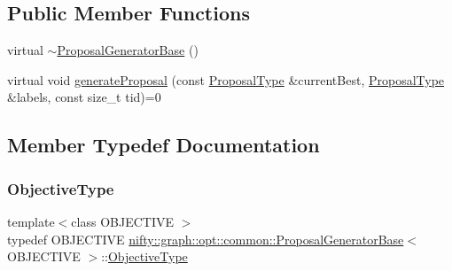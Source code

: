 \subsection*{Public Member Functions}
\begin{DoxyCompactItemize}
\item 
virtual \hyperlink{classnifty_1_1graph_1_1opt_1_1common_1_1ProposalGeneratorBase_ac3cf261170f3fb5beb3ecfc483e3fb48}{$\sim$\+Proposal\+Generator\+Base} ()
\item 
virtual void \hyperlink{classnifty_1_1graph_1_1opt_1_1common_1_1ProposalGeneratorBase_abb7b02d650049f52733b3f2dc81bb395}{generate\+Proposal} (const \hyperlink{classnifty_1_1graph_1_1opt_1_1common_1_1ProposalGeneratorBase_a122993da5c326628cdb865a6279d20c5}{Proposal\+Type} \&current\+Best, \hyperlink{classnifty_1_1graph_1_1opt_1_1common_1_1ProposalGeneratorBase_a122993da5c326628cdb865a6279d20c5}{Proposal\+Type} \&labels, const size\+\_\+t tid)=0
\end{DoxyCompactItemize}


\subsection{Member Typedef Documentation}
\mbox{\label{classnifty_1_1graph_1_1opt_1_1common_1_1ProposalGeneratorBase_aebac1b29ca57644245abe4a9f00b53d0}} 
\subsubsection{\texorpdfstring{Objective\+Type}{ObjectiveType}}
{\footnotesize\ttfamily template$<$class O\+B\+J\+E\+C\+T\+I\+VE $>$ \\
typedef O\+B\+J\+E\+C\+T\+I\+VE \hyperlink{classnifty_1_1graph_1_1opt_1_1common_1_1ProposalGeneratorBase}{nifty\+::graph\+::opt\+::common\+::\+Proposal\+Generator\+Base}$<$ O\+B\+J\+E\+C\+T\+I\+VE $>$\+::\hyperlink{classnifty_1_1graph_1_1opt_1_1common_1_1ProposalGeneratorBase_aebac1b29ca57644245abe4a9f00b53d0}{Objective\+Type}}

\mbox{\label{classnifty_1_1graph_1_1opt_1_1common_1_1ProposalGeneratorBase_a122993da5c326628cdb865a6279d20c5}} 
